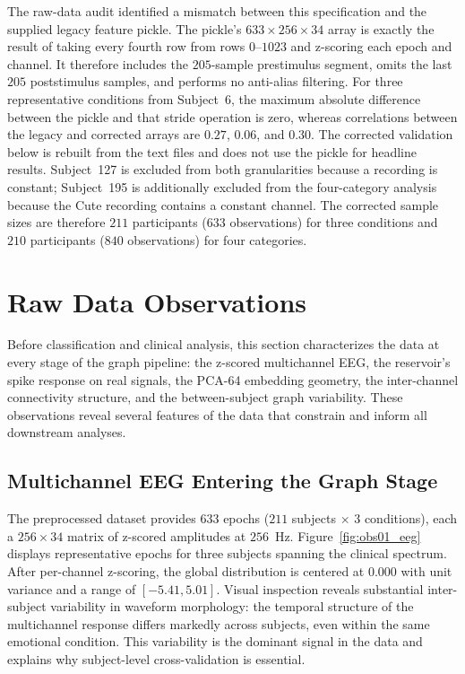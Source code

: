 The raw-data audit identified a mismatch between this specification and the supplied legacy feature pickle. The pickle's $633\times256\times34$ array is exactly the result of taking every fourth row from rows $0$--$1023$ and z-scoring each epoch and channel. It therefore includes the $205$-sample prestimulus segment, omits the last $205$ poststimulus samples, and performs no anti-alias filtering. For three representative conditions from Subject~6, the maximum absolute difference between the pickle and that stride operation is zero, whereas correlations between the legacy and corrected arrays are $0.27$, $0.06$, and $0.30$. The corrected validation below is rebuilt from the text files and does not use the pickle for headline results. Subject~127 is excluded from both granularities because a recording is constant; Subject~195 is additionally excluded from the four-category analysis because the Cute recording contains a constant channel. The corrected sample sizes are therefore $211$ participants ($633$ observations) for three conditions and $210$ participants ($840$ observations) for four categories.


\section{Raw Data Observations}
\label{sec:ch5_raw_obs}

Before classification and clinical analysis, this section characterizes the data at every stage of the graph pipeline: the z-scored multichannel EEG, the reservoir's spike response on real signals, the PCA-64 embedding geometry, the inter-channel connectivity structure, and the between-subject graph variability. These observations reveal several features of the data that constrain and inform all downstream analyses.

\subsection{Multichannel EEG Entering the Graph Stage}

The preprocessed dataset provides $633$ epochs ($211$ subjects $\times$ $3$ conditions), each a $256 \times 34$ matrix of z-scored amplitudes at $256$~Hz. Figure~\ref{fig:obs01_eeg} displays representative epochs for three subjects spanning the clinical spectrum. After per-channel z-scoring, the global distribution is centered at $0.000$ with unit variance and a range of $[-5.41, 5.01]$. Visual inspection reveals substantial inter-subject variability in waveform morphology: the temporal structure of the multichannel response differs markedly across subjects, even within the same emotional condition. This variability is the dominant signal in the data and explains why subject-level cross-validation is essential.

